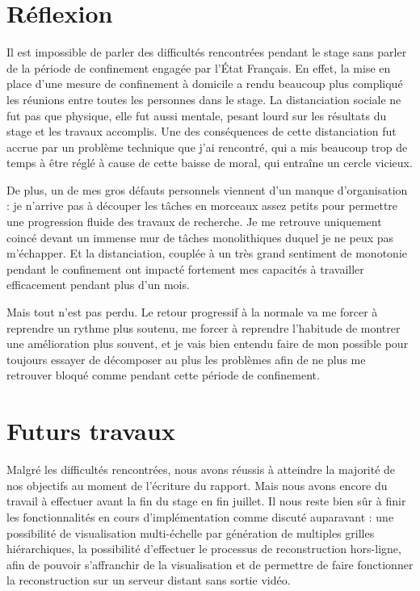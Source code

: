 {	\section{Réflexion}
	{
		\par
		Il est impossible de parler des difficultés rencontrées pendant le stage sans parler de la période de confinement engagée par l'\'Etat Français. En effet, la mise en place d'une mesure de confinement à domicile a rendu beaucoup plus compliqué les réunions entre toutes les personnes dans le stage. La distanciation sociale ne fut pas que physique, elle fut aussi mentale, pesant lourd sur les résultats du stage et les travaux accomplis. Une des conséquences de cette distanciation fut accrue par un problème technique que j'ai rencontré, qui a mis beaucoup trop de temps à être réglé à cause de cette baisse de moral, qui entraîne un cercle vicieux.\par
		De plus, un de mes gros défauts personnels viennent d'un manque d'organisation : je n'arrive pas à découper les tâches en morceaux assez petits pour permettre une progression fluide des travaux de recherche. Je me retrouve uniquement coincé devant un immense mur de tâches monolithiques duquel je ne peux pas m'échapper. Et la distanciation, couplée à un très grand sentiment de monotonie pendant le confinement ont impacté fortement mes capacités à travailler efficacement pendant plus d'un mois.\par
		Mais tout n'est pas perdu. Le retour progressif à la normale va me forcer à reprendre un rythme plus soutenu, me forcer à reprendre l'habitude de montrer une amélioration plus souvent, et je vais bien entendu faire de mon possible pour toujours essayer de décomposer au plus les problèmes afin de ne plus me retrouver bloqué comme pendant cette période de confinement.
	}

	\section{Futurs travaux}
	{
		\par
		Malgré les difficultés rencontrées, nous avons réussis à atteindre la majorité de nos objectifs au moment de l'écriture du rapport. Mais nous avons encore du travail à effectuer avant la fin du stage en fin juillet. Il nous reste bien sûr à finir les fonctionnalités en cours d'implémentation comme discuté auparavant : une possibilité de visualisation multi-échelle par génération de multiples grilles hiérarchiques, la possibilité d'effectuer le processus de reconstruction hors-ligne, afin de pouvoir s'affranchir de la visualisation et de permettre de faire fonctionner la reconstruction sur un serveur distant sans sortie vidéo.\par
	}
}

